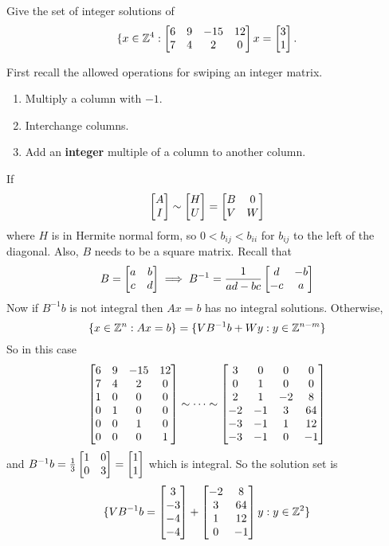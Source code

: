 \documentclass{exam}
\begin{document}
    \begin{question}
        Give the set of integer solutions of
        \[
            \{ x \in \integers^4 : \matrix{6 & 9 & - 15 & 12 \\ 7 & 4 & 2 & 0} x = \matrix{3 \\ 1}.
        \]
    \end{question}
    \begin{answer}
        First recall the allowed operations for swiping an integer matrix.
        \begin{enumerate}
            \item Multiply a column with $-1$.
            \item Interchange columns.
            \item Add an \textbf{integer} multiple of a column to another column.
        \end{enumerate}
        If
        \[
            \matrix{A \\ I} \sim \matrix{H \\ U} = \matrix{B & 0 \\ V & W}
        \]
        where $H$ is in Hermite normal form, so $0 < b_{ij} < b_{ii}$ for $b_{ij}$ to the left of the diagonal.
        Also, $B$ needs to be a square matrix.
        Recall that
        \[
            B = \matrix {a & b \\ c & d} \implies B^{-1} = \frac{1}{ad-bc} \matrix{d & -b \\ -c & a}
        \]
        Now if $B^{-1}b$ is not integral then $Ax=b$ has no integral solutions.
        Otherwise,
        \[
            \{ x \in \mathbb{Z}^n : Ax=b \} = \{ VB^{-1}b + W y : y \in \mathbb{Z}^{n-m} \}
        \]
        So in this case
        \[
            \matrix{6 & 9 & -15 & 12 \\ 7 & 4 & 2 & 0 \\ 1 & 0 & 0 & 0 \\ 0 & 1 & 0 & 0 \\ 0 & 0 & 1 & 0 \\ 0 & 0 & 0 & 1} \sim \dots \sim  \matrix{3 & 0 & 0 & 0 \\ 0 & 1 & 0 & 0 \\ 2 & 1 & -2 & 8 \\ -2 & -1 & 3 & 64 \\ -3 & -1 & 1 & 12 \\ -3 & -1 & 0 & -1}
        \]
        and $B^{-1}b = \frac 1 3 \matrix{1 & 0 \\ 0 & 3} = \matrix{1\\1}$ which is integral.
        So the solution set is
        \[
            \{ VB^{-1}b=\matrix{3\\-3\\-4\\-4} + \matrix{-2 & 8 \\ 3 & 64 \\ 1 & 12  \\ 0 & -1} y : y \in \integers ^2 \}
        \]
    \end{answer}
\end{document}
